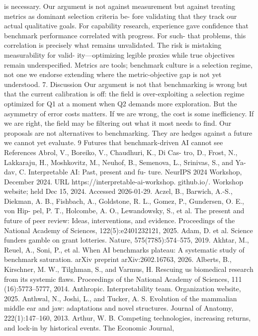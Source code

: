 is necessary. Our argument is not against measurement but
against treating metrics as dominant selection criteria be-
fore validating that they track our actual qualitative goals.
For capability research, experience gave confidence that
benchmark performance correlated with progress. For such-
that problems, this correlation is precisely what remains
unvalidated. The risk is mistaking measurability for valid-
ity—optimizing legible proxies while true objectives remain
underspecified. Metrics are tools; benchmark culture is a
selection regime, not one we endorse extending where the
metric-objective gap is not yet understood.
7. Discussion
Our argument is not that benchmarking is wrong but that
the current calibration is off: the field is over-exploiting a
selection regime optimized for Q1 at a moment when Q2
demands more exploration. But the asymmetry of error costs
matters. If we are wrong, the cost is some inefficiency. If we
are right, the field may be filtering out what it most needs
to find. Our proposals are not alternatives to benchmarking.
They are hedges against a future we cannot yet evaluate.
9
Futures that benchmark-driven AI cannot see
References
Abrol,
V.,
Boreiko,
V.,
Chaudhuri,
K.,
Di
Cas-
tro, D., Frost, N., Lakkaraju, H., Moshkovitz, M.,
Neuhof, B., Semenova, L., Srinivas, S., and Ya-
dav, C.
Interpretable AI: Past, present and fu-
ture.
NeurIPS 2024 Workshop, December 2024.
URL https://interpretable-ai-workshop.
github.io/. Workshop website; held Dec 15, 2024.
Accessed 2026-01-29.
Aczel, B., Barwich, A.-S., Diekman, A. B., Fishbach, A.,
Goldstone, R. L., Gomez, P., Gundersen, O. E., von Hip-
pel, P. T., Holcombe, A. O., Lewandowsky, S., et al. The
present and future of peer review: Ideas, interventions,
and evidence. Proceedings of the National Academy of
Sciences, 122(5):e2401232121, 2025.
Adam, D. et al. Science funders gamble on grant lotteries.
Nature, 575(7785):574–575, 2019.
Akhtar, M., Reuel, A., Soni, P., et al. When AI benchmarks
plateau: A systematic study of benchmark saturation.
arXiv preprint arXiv:2602.16763, 2026.
Alberts, B., Kirschner, M. W., Tilghman, S., and Varmus, H.
Rescuing us biomedical research from its systemic flaws.
Proceedings of the National Academy of Sciences, 111
(16):5773–5777, 2014.
Anthropic. Interpretability team. Organization website,
2025.
Anthwal, N., Joshi, L., and Tucker, A. S. Evolution of the
mammalian middle ear and jaw: adaptations and novel
structures. Journal of Anatomy, 222(1):147–160, 2013.
Arthur, W. B. Competing technologies, increasing returns,
and lock-in by historical events. The Economic Journal,
